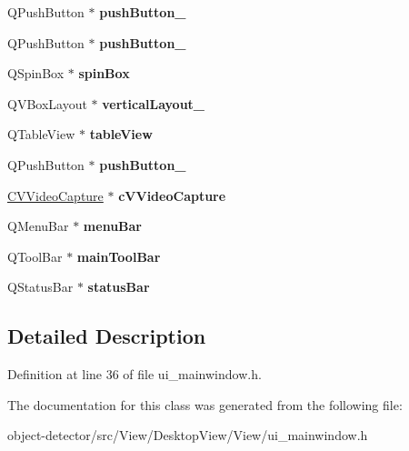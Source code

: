 \begin{DoxyCompactItemize}
\mbox{\label{class_ui___main_window_a3f20112708231220f3a4f567802130c5}} 
Q\+Push\+Button $\ast$ {\bfseries push\+Button\+\_}
\item 
\mbox{\label{class_ui___main_window_adafdad7c065227c5d14b68d75789cbe2}} 
Q\+Push\+Button $\ast$ {\bfseries push\+Button\+\_}
\item 
\mbox{\label{class_ui___main_window_a5ee2488c049a177071c1485b4138e113}} 
Q\+Spin\+Box $\ast$ {\bfseries spin\+Box}
\item 
\mbox{\label{class_ui___main_window_a38b8a4b887f3b58e2a49e7905ae6f1f0}} 
Q\+V\+Box\+Layout $\ast$ {\bfseries vertical\+Layout\+\_}
\item 
\mbox{\label{class_ui___main_window_a3f4332a5b5e82f676f25ec3148c1c83c}} 
Q\+Table\+View $\ast$ {\bfseries table\+View}
\item 
\mbox{\label{class_ui___main_window_acb0b2f196dc2224f287b67594233297f}} 
Q\+Push\+Button $\ast$ {\bfseries push\+Button\+\_}
\item 
\mbox{\label{class_ui___main_window_a202ae5e4de2494091a0640f9e7a5bcd0}} 
\hyperlink{class_c_v_video_capture}{C\+V\+Video\+Capture} $\ast$ {\bfseries c\+V\+Video\+Capture}
\item 
\mbox{\label{class_ui___main_window_a2be1c24ec9adfca18e1dcc951931457f}} 
Q\+Menu\+Bar $\ast$ {\bfseries menu\+Bar}
\item 
\mbox{\label{class_ui___main_window_a5172877001c8c7b4e0f6de50421867d1}} 
Q\+Tool\+Bar $\ast$ {\bfseries main\+Tool\+Bar}
\item 
\mbox{\label{class_ui___main_window_a50fa481337604bcc8bf68de18ab16ecd}} 
Q\+Status\+Bar $\ast$ {\bfseries status\+Bar}
\end{DoxyCompactItemize}


\subsection{Detailed Description}


Definition at line 36 of file ui\+\_\+mainwindow.\+h.



The documentation for this class was generated from the following file\+:\begin{DoxyCompactItemize}
\item 
object-\/detector/src/\+View/\+Desktop\+View/\+View/ui\+\_\+mainwindow.\+h\end{DoxyCompactItemize}
